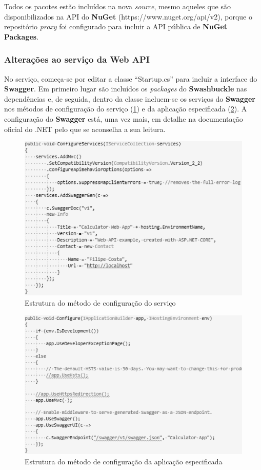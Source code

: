 Todos os pacotes estão incluídos na nova \textit{source}, mesmo aqueles que são disponibilizados na API do \textbf{NuGet} (https://www.nuget.org/api/v2), porque o repositório \textit{proxy} foi configurado para incluir a API pública de \textbf{NuGet Packages}.

\subsubsection{Alterações ao serviço da Web API}

\hspace{1cm}No serviço, começa-se por editar a classe ``Startup.cs'' para incluir a interface do \textbf{Swagger}. Em primeiro lugar são incluídos os \textit{packages} do \textbf{Swashbuckle} nas dependências e, de seguida, dentro da classe incluem-se os serviços do \textbf{Swagger} nos métodos de configuração do serviço (\ref{Fig:Fig45}) e da aplicação especificada (\ref{Fig:Fig46}). A configuração do \textbf{Swagger} está, uma vez mais, em detalhe na documentação oficial \cite{dotnetwithswagger} do .NET pelo que se aconselha a sua leitura.

\begin{figure}[hbt!]
\centering
\includegraphics[width=0.65\linewidth]{Cap5/VSStartupClass1.png}
\caption{Estrutura do método de configuração do serviço}
\label{Fig:Fig45}
\end{figure}

\begin{figure}[hbt!]
\centering
\includegraphics[width=0.65\linewidth]{Cap5/VSStartupClass2.png}
\caption{Estrutura do método de configuração da aplicação especificada}
\label{Fig:Fig46}
\end{figure}


